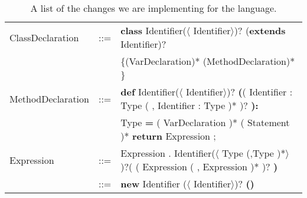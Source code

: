\begin{table}[h]
  \caption{A list of the changes we are implementing for the language.}
  \begin{tabular}{ l  c  l}
    \hline
    ClassDeclaration & ::= & \textbf{class} Identifier($\langle$ Identifier$\rangle$)?
    (\textbf{extends} Identifier)?  \\
    && \{(VarDeclaration)* (MethodDeclaration)* \}  \\
    \hline
    MethodDeclaration & ::= & \textbf{def} Identifier($\langle$ Identifier$\rangle$)?
    \textbf{(}( Identifier : Type ( , Identifier : Type )* )? \textbf{):}\\
    &&Type \textbf{=}
    { ( VarDeclaration )* ( Statement )*
    \textbf{return} Expression ; }\\
    \hline
    Expression & ::= &  Expression . Identifier($\langle$ Type (,Type )*$\rangle$ )?( ( Expression ( , Expression )* )? \textbf{)} \\
    & ::= & \textbf{new} Identifier ($\langle$ Identifier$\rangle$)? \textbf{()} \\
    \hline
  \end{tabular}
\end{table}
